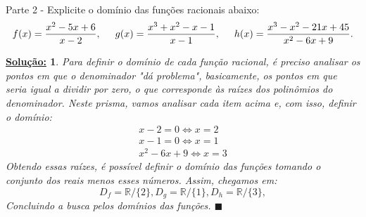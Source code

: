 \documentclass{article}
\newtheorem*{sol*}{\underline{Solu\c c\~ao:}}
\renewcommand\qedsymbol{$\blacksquare$}
\begin{document}
\paragraph{} Parte 2 - Explicite o dom\'inio das fun\c c\~oes racionais abaixo:
$$
	f(x) = \frac{x^2 - 5x + 6}{x - 2}, \hspace{0.5cm} g(x) = \frac{x^3 + x^2 - x - 1}{x - 1}, \hspace{0.5cm} h(x) = \frac{x^3 - x^2 - 21x + 45}{x^2 - 6x + 9}.
$$
\begin{sol*}
	Para definir o dom\'inio de cada fun\c c\~ao racional, \'e preciso analisar os pontos em que o denominador "d\'a problema", basicamente, os pontos em que seria igual a dividir por zero, o que corresponde \`as ra\'izes dos polin\^omios do denominador. Neste prisma, vamos analisar cada item acima e, com isso, definir o dom\'inio:
	\begin{align*}
		x - 2 = 0 \Leftrightarrow x = 2 \\
		x - 1 = 0 \Leftrightarrow x = 1 \\
		x^2 - 6x + 9 \Leftrightarrow x = 3
	\end{align*}
	Obtendo essas ra\'izes, \'e poss\'ivel definir o dom\'inio das fun\c c\~oes tomando o conjunto dos reais menos esses n\'umeros. Assim, chegamos em:
	$$
		D_f = \mathbb{R}\slash\{2\}, D_g = \mathbb{R}\slash\{1\}, D_h = \mathbb{R}\slash\{3\},
	$$
	Concluindo a busca pelos dom\'inios das fun\c c\~oes.
	\qedsymbol
\end{sol*}
\end{document}
